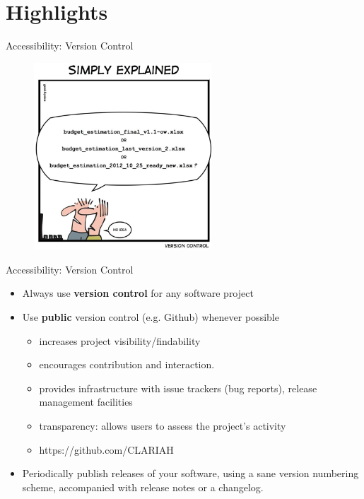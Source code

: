 \documentclass[compress]{beamer}
\begin{document}
\section{Highlights}

\begin{frame}{Accessibility: Version Control}
\begin{figure}
\includegraphics[height=7cm]{img/versioncontrol.jpg}
\end{figure}
\end{frame}

\begin{frame}{Accessibility: Version Control}
\begin{itemize}
    \item Always use \textbf{version control} for any software project
    \item Use \textbf{public} version control (e.g. Github) whenever possible
    \begin{itemize}
        \item increases project visibility/findability
        \item encourages contribution and interaction.
        \item provides infrastructure with issue trackers (bug reports), release management facilities
        \item transparency: allows users to assess the project's activity
        \item https://github.com/CLARIAH
    \end{itemize}
    \item Periodically publish releases of your software, using a sane version
        numbering scheme, accompanied with release notes or a changelog.
\end{itemize}
\end{frame}
\end{document}
